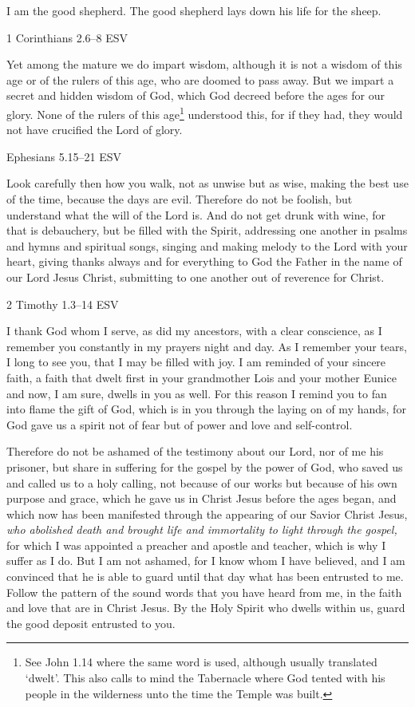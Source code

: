 \documentclass[
]{article}
\begin{document}
I am the good shepherd. The good shepherd lays down his life for the
sheep.

1 Corinthians 2.6--8 ESV

Yet among the mature we do impart wisdom, although it is not a wisdom of
this age or of the rulers of this age, who are doomed to pass away. But
we impart a secret and hidden wisdom of God, which God decreed before
the ages for our glory. None of the rulers of this age\footnote{See John
  1.14 where the same word is used, although usually translated `dwelt'.
  This also calls to mind the Tabernacle where God tented with his
  people in the wilderness unto the time the Temple was built.}
understood this, for if they had, they would not have crucified the Lord
of glory.

Ephesians 5.15--21 ESV

Look carefully then how you walk, not as unwise but as wise, making the
best use of the time, because the days are evil. Therefore do not be
foolish, but understand what the will of the Lord is. And do not get
drunk with wine, for that is debauchery, but be filled with the Spirit,
addressing one another in psalms and hymns and spiritual songs, singing
and making melody to the Lord with your heart, giving thanks always and
for everything to God the Father in the name of our Lord Jesus Christ,
submitting to one another out of reverence for Christ.

2 Timothy 1.3--14 ESV

I thank God whom I serve, as did my ancestors, with a clear conscience,
as I remember you constantly in my prayers night and day. As I remember
your tears, I long to see you, that I may be filled with joy. I am
reminded of your sincere faith, a faith that dwelt first in your
grandmother Lois and your mother Eunice and now, I am sure, dwells in
you as well. For this reason I remind you to fan into flame the gift of
God, which is in you through the laying on of my hands, for God gave us
a spirit not of fear but of power and love and self-control.

Therefore do not be ashamed of the testimony about our Lord, nor of me
his prisoner, but share in suffering for the gospel by the power of God,
who saved us and called us to a holy calling, not because of our works
but because of his own purpose and grace, which he gave us in Christ
Jesus before the ages began, and which now has been manifested through
the appearing of our Savior Christ Jesus, \emph{who abolished death and
brought life and immortality to light through the gospel,} for which I
was appointed a preacher and apostle and teacher, which is why I suffer
as I do. But I am not ashamed, for I know whom I have believed, and I am
convinced that he is able to guard until that day what has been
entrusted to me. Follow the pattern of the sound words that you have
heard from me, in the faith and love that are in Christ Jesus. By the
Holy Spirit who dwells within us, guard the good deposit entrusted to
you.
\end{document}

